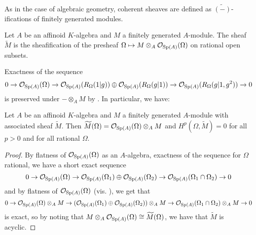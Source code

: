 As in the case of algebraic geometry, coherent sheaves are defined as $\widetilde{(-)}$-ifications of finitely generated modules. 
\begin{definition}[$\widetilde{(-)}$]\label{def: tildeification}
    Let $A$ be an affinoid $K$-algebra and $M$ a finitely generated $A$-module. The sheaf $\widetilde{M}$ is the sheafification of the presheaf $\Omega\mapsto M\otimes_{A}\mathcal{O}_{\mathrm{Sp}(A)}(\Omega)$ on rational open subsets. 
\end{definition}
Exactness of the sequence 
$$0\to\mathcal{O}_{\mathrm{Sp}(A)}(\Omega)\to\mathcal{O}_{\mathrm{Sp}(A)}(R_{\Omega}(1|g))\oplus\mathcal{O}_{\mathrm{Sp}(A)}(R_{\Omega}(g|1))\to\mathcal{O}_{\mathrm{Sp}(A)}(R_{\Omega}(g|1,g^{2}))\to0$$
is preserved under $-\otimes_{A}M$ by . In particular, we have:
\begin{proposition}\label{prop: tildeification is tensor}
    Let $A$ be an affinoid $K$-algebra and $M$ a finitely generated $A$-module with associated sheaf $\widetilde{M}$. Then $\widetilde{M}(\Omega)=\mathcal{O}_{\mathrm{Sp}(A)}(\Omega)\otimes_{A}M$ and $H^{p}(\Omega,\widetilde{M})=0$ for all $p>0$ and for all rational $\Omega$. 
\end{proposition}
\begin{proof}
    By flatness of $\mathcal{O}_{\mathrm{Sp}(A)}(\Omega)$ as an $A$-algebra, exactness of the sequence for $\Omega$ rational, we have a short exact sequence 
    $$0\to\mathcal{O}_{\mathrm{Sp}(A)}(\Omega)\to\mathcal{O}_{\mathrm{Sp}(A)}(\Omega_{1})\oplus\mathcal{O}_{\mathrm{Sp}(A)}(\Omega_{2})\to\mathcal{O}_{\mathrm{Sp}(A)}(\Omega_{1}\cap\Omega_{2})\to0$$
    and by flatness of $\mathcal{O}_{\mathrm{Sp}(A)}(\Omega)$ (vis. \cite[\href{https://stacks.math.columbia.edu/tag/00M5}{Tag 00M5}]{stacks-project}), we get that 
    $$0\to\mathcal{O}_{\mathrm{Sp}(A)}(\Omega)\otimes_{A}M\to(\mathcal{O}_{\mathrm{Sp}(A)}(\Omega_{1})\oplus\mathcal{O}_{\mathrm{Sp}(A)}(\Omega_{2}))\otimes_{A}M\to\mathcal{O}_{\mathrm{Sp}(A)}(\Omega_{1}\cap\Omega_{2})\otimes_{A}M\to0$$
    is exact, so by noting that $M\otimes_{A}\mathcal{O}_{\mathrm{Sp}(A)}(\Omega)\cong\widetilde{M}(\Omega)$, we have that $\widetilde{M}$ is acyclic. 
\end{proof}